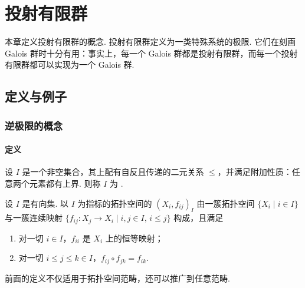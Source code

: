 
\chapter{投射有限群}
\label{ch:3}

本章定义投射有限群的概念. 投射有限群定义为一类特殊系统的极限. 它们在刻画 Galois 群时十分有用：事实上，每一个 Galois 群都是投射有限群，而每一个投射有限群都可以实现为一个 Galois 群.

\section{定义与例子}

\subsection{逆极限的概念}

\subsubsection{定义}

\begin{definition}\label{c3-def-1-1}
设 $I$ 是一个非空集合，其上配有自反且传递的二元关系 $\leq$，并满足附加性质：任意两个元素都有上界. 则称 $I$ 为 .
\end{definition}

\begin{definition}\label{c3-def-1-2}
设 $I$ 是有向集. 以 $I$ 为指标的拓扑空间的  $(X_i,f_{ij})_I$ 由一簇拓扑空间 $\{X_i\mid i\in I\}$ 与一簇连续映射 $\{f_{ij}:X_j\to X_i\mid i,j\in I,\,i\leq j\}$ 构成，且满足
\begin{enumerate}[label=(\arabic*),leftmargin=*]
    \item 对一切 $i\in I$，$f_{ii}$ 是 $X_i$ 上的恒等映射；
    \item 对一切 $i\leq j\leq k\in I$，$f_{ij}\circ f_{jk}=f_{ik}$.
\end{enumerate}
\end{definition}

\begin{remark}\label{c3-rem-1-3}
前面的定义不仅适用于拓扑空间范畴，还可以推广到任意范畴.
\end{remark}

